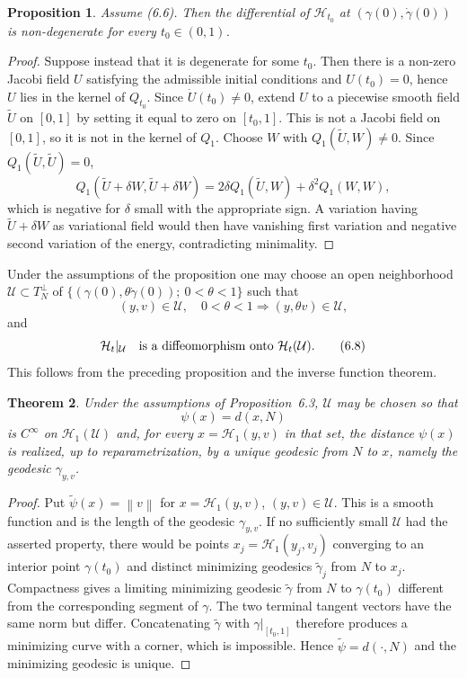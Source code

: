 \documentclass[11pt,a4paper]{article}
\newcommand{\norm}[1]{\left\lVert #1\right\rVert}
\numberwithin{equation}{section}
\newtheorem{theorem}{Theorem}[section]
\newtheorem{proposition}[theorem]{Proposition}
\theoremstyle{remark}
\begin{document}
\begin{proposition}
Assume (6.6). Then the differential of $\mathcal H_{t_0}$ at $(\gamma(0),\dot\gamma(0))$ is non-degenerate for every $t_0\in(0,1)$.
\end{proposition}
\begin{proof}
Suppose instead that it is degenerate for some $t_0$. Then there is a non-zero Jacobi field $U$ satisfying the admissible initial conditions and $U(t_0)=0$, hence $U$ lies in the kernel of $Q_{t_0}$. Since $\dot U(t_0)\ne0$, extend $U$ to a piecewise smooth field $\widetilde U$ on $[0,1]$ by setting it equal to zero on $[t_0,1]$. This is not a Jacobi field on $[0,1]$, so it is not in the kernel of $Q_1$. Choose $W$ with $Q_1(\widetilde U,W)\ne0$. Since $Q_1(\widetilde U,\widetilde U)=0$,
\[
Q_1(\widetilde U+\delta W,\widetilde U+\delta W)
=2\delta Q_1(\widetilde U,W)+\delta^2Q_1(W,W),
\]
which is negative for $\delta$ small with the appropriate sign. A variation having $\widetilde U+\delta W$ as variational field would then have vanishing first variation and negative second variation of the energy, contradicting minimality.
\end{proof}

Under the assumptions of the proposition one may choose an open neighborhood
$\mathcal U\subset T_N^\perp$ of
$\{(\gamma(0),\theta\dot\gamma(0));\ 0<\theta<1\}$ such that
\begin{equation}
(y,v)\in\mathcal U,
\quad0<\theta<1
\Longrightarrow (y,\theta v)\in\mathcal U,
\tag{6.7}
\end{equation}
and
\begin{equation}
\mathcal H_t|_{\mathcal U}
\quad\hbox{is a diffeomorphism onto }\mathcal H_t(\mathcal U).
\tag{6.8}
\end{equation}
This follows from the preceding proposition and the inverse function theorem.

\begin{theorem}
Under the assumptions of Proposition~6.3, $\mathcal U$ may be chosen so that
\[
\psi(x)=d(x,N)
\]
is $C^\infty$ on $\mathcal H_1(\mathcal U)$ and, for every
$x=\mathcal H_1(y,v)$ in that set, the distance $\psi(x)$ is realized, up to reparametrization, by a unique geodesic from $N$ to $x$, namely the geodesic $\gamma_{y,v}$.
\end{theorem}
\begin{proof}
Put $\widetilde\psi(x)=\norm v$ for $x=\mathcal H_1(y,v)$, $(y,v)\in\mathcal U$. This is a smooth function and is the length of the geodesic $\gamma_{y,v}$. If no sufficiently small $\mathcal U$ had the asserted property, there would be points $x_j=\mathcal H_1(y_j,v_j)$ converging to an interior point $\gamma(t_0)$ and distinct minimizing geodesics $\widetilde\gamma_j$ from $N$ to $x_j$. Compactness gives a limiting minimizing geodesic $\widetilde\gamma$ from $N$ to $\gamma(t_0)$ different from the corresponding segment of $\gamma$. The two terminal tangent vectors have the same norm but differ. Concatenating $\widetilde\gamma$ with $\gamma|_{[t_0,1]}$ therefore produces a minimizing curve with a corner, which is impossible. Hence $\widetilde\psi=d(\cdot,N)$ and the minimizing geodesic is unique.
\end{proof}
\end{document}
